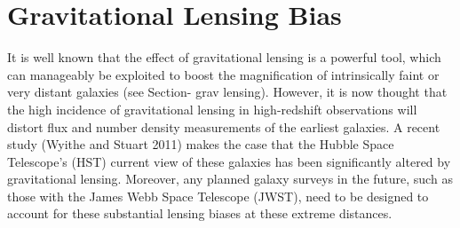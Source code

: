 \documentclass [a4paper, 12pt] {article}
\begin{document}
\section{Gravitational Lensing Bias}

It is well known that the effect of gravitational lensing is a powerful tool, which can manageably be exploited to boost the magnification of intrinsically faint or very distant galaxies (see Section- grav lensing). However, it is now thought that the high incidence of gravitational lensing in high-redshift observations will distort flux and number density measurements of the earliest galaxies\cite{distortionsinthegravitationallens}. A recent study (Wyithe and Stuart 2011) makes the case that the Hubble Space Telescope's (HST) current view of these galaxies has been significantly altered by gravitational lensing. Moreover, any planned galaxy surveys in the future, such as those with the James Webb Space Telescope (JWST), need to be designed to account for these substantial lensing biases at these extreme distances\cite{wyithestuart2011}.
\end{document}
